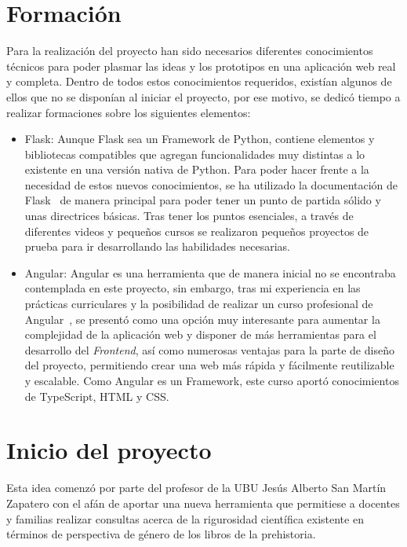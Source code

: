 \section{Formación}
Para la realización del proyecto han sido necesarios diferentes conocimientos técnicos para poder plasmar las ideas y los prototipos en una aplicación web real y completa. Dentro de todos estos conocimientos requeridos, existían algunos de ellos que no se disponían al iniciar el proyecto, por ese motivo, se dedicó tiempo a realizar formaciones sobre los siguientes elementos:
\begin{itemize}
    \item Flask: Aunque Flask sea un Framework de Python, contiene elementos y bibliotecas compatibles que agregan funcionalidades muy distintas a lo existente en una versión nativa de Python.
    Para poder hacer frente a la necesidad de estos nuevos conocimientos, se ha utilizado la documentación de Flask~\cite{Flask} de manera principal para poder tener un punto de partida sólido y unas directrices básicas. Tras tener los puntos esenciales, a través de diferentes videos y pequeños cursos se realizaron pequeños proyectos de prueba para ir desarrollando las habilidades necesarias.

    \item Angular: Angular es una herramienta que de manera inicial no se encontraba contemplada en este proyecto, sin embargo, tras mi experiencia en las prácticas curriculares y la posibilidad de realizar un curso profesional de Angular~\cite{CursoAngular}, se presentó como una opción muy interesante para aumentar la complejidad de la aplicación web y disponer de más herramientas para el desarrollo del \textit{Frontend}, así como numerosas ventajas para la parte de diseño del proyecto, permitiendo crear una web más rápida y fácilmente reutilizable y escalable. 
    Como Angular es un Framework, este curso aportó conocimientos de TypeScript, HTML y CSS.
\end{itemize}

\section{Inicio del proyecto}
Esta idea comenzó por parte del profesor de la UBU Jesús Alberto San Martín Zapatero con el afán de aportar una nueva herramienta que permitiese a docentes y familias realizar consultas acerca de la rigurosidad científica existente en términos de perspectiva de género de los libros de la prehistoria. 

